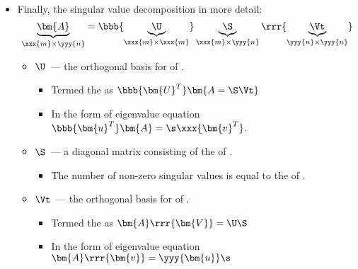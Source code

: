 \begin{itemize}
\begin{itemize}
\begin{itemize}
\begin{itemize}
        \end{itemize}
        \item And that the \hyperref[Column Space]{} of matrices multiplied with their transpose are the same the original matrix column/row space, i.e., 
        \[%
        \yyy{C}(\bm{A\rrr{A^T}}) = \yyy{C}(\bm{\xxx{S}}) = \yyy{C}(\bm{A}), \quad \xxx{R}(\bm{\bbb{A^T} A}) = \xxx{R}(\yyy{\bm{S}}) = \xxx{R}(\bm{A})
        \]%
      \end{itemize}
      \item Finally, the singular value decomposition in more detail:
      \[%
      \underbrace{\bm{A}}_{\xxx{m} \times \yyy{n}} = \bbb{\underbrace{\U}_{\xxx{m} \times \xxx{m}}} \underbrace{\S}_{\xxx{m} \times \yyy{n}} \rrr{\underbrace{\Vt}_{\yyy{n} \times \yyy{n}}}
      \]%
      \begin{itemize}
        \item \(\U\)~--- the orthogonal basis for  of .
          \begin{itemize}
            \item Termed the  as \(\bbb{\bm{U}^T}\bm{A = \S \Vt}\)
            \item In the form of eigenvalue equation \(\bbb{\bm{u}^T}\bm{A}=\s \xxx{\bm{v}^T}\).
          \end{itemize}
        \item \(\S\)~--- a diagonal matrix consisting of the  of . 
          \begin{itemize}
            \item The number of non-zero singular values is equal to the \hyperref[Matrix Rank]{} of .
          \end{itemize}
        \item \(\Vt\)~--- the orthogonal basis for  of .
          \begin{itemize}
            \item Termed the  as \(\bm{A}\rrr{\bm{V}} = \U \S\)
            \item In the form of eigenvalue equation \(\bm{A}\rrr{\bm{v}}= \yyy{\bm{u}} \s\)
          \end{itemize}
      \end{itemize}
    \end{itemize}
  

\end{itemize}
